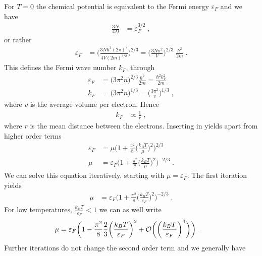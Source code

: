 %
For $T=0$ the chemical potential is equivalent to the Fermi energy $\varepsilon_{F}$ and we have
%
\begin{align}\label{eq:spin:para:aux1}
\frac{3 N}{4 D} &= \varepsilon_{F}^{3/2}\;,
\end{align}
%
or rather
%
\begin{align*}
\varepsilon_{F} 
&=  \bigg(\frac{3 N \hbar^{3}  (2\pi)^{2} }{4 V(2m)^{3/2}} \bigg)^{2/3}
=  \bigg(\frac{3 N   \pi^{2} }{ V} \bigg)^{2/3}\;\frac{\hbar^{2}}{2 m}\;.
\end{align*}
%
%
This defines the Fermi wave number $k_{F}$, through
%
\begin{align*}
\varepsilon_{F} &
= \bigg(3  \pi^{2} n\bigg)^{2/3}\frac{\hbar^{2}}{2m} 
= \frac{\hbar^{2}	k_{F}^{2} }{2m}\\
k_{F}&=\bigg(3  \pi^{2} n\bigg)^{1/3} = \bigg(\frac{3 \pi^{2}}{v}\bigg)^{1/3 }\;,
\end{align*}
%
where $v$ is the average volume per electron. Hence 
%
\begin{align*}
k_{F} &\propto \frac{1}{r}\;,
\end{align*}
%
where $r$ is the mean distance between the electrons.
Inserting  in  yields apart from higher order terms
%
\begin{align*}
\varepsilon_{F}
&= \mu\bigg(1 +\frac{\pi^{2}}{8}\bigg(\frac{ k_{B}T }{\mu}\bigg)^{2}\bigg)^{2/3}\\
\mu &= \varepsilon_{F}\bigg(1 +\frac{\pi^{2}}{8}\bigg(\frac{ k_{B}T }{\mu}\bigg)^{2}\bigg)^{-2/3}\;.
\end{align*}
%
We can solve this equation iteratively, starting with 
$\mu=\varepsilon_{F}$. The first iteration yields
%
\begin{align*}
\mu &=\varepsilon_{F}\bigg(1 +\frac{\pi^{2}}{8}\bigg(\frac{ k_{B}T }{\varepsilon_{F}}\bigg)^{2}\bigg)^{-2/3}\;.
\end{align*}
%
For low temperatures, 
$\frac{ k_{B}T }{\varepsilon_{F}}<1$ we can as well write
\begin{align*}
\mu &=\varepsilon_{F}\bigg(1 -\frac{\pi^{2}}{8}\frac{2}{3}\bigg(\frac{ k_{B}T }{\varepsilon_{F}}\bigg)^{2} +{\cal O}\bigg( \bigg( \frac{k_{B}T}{\varepsilon_{F}} \bigg)^{4} \bigg)\bigg)\;.
\end{align*}
%
Further iterations do not change the second order term and we generally have
%
%

